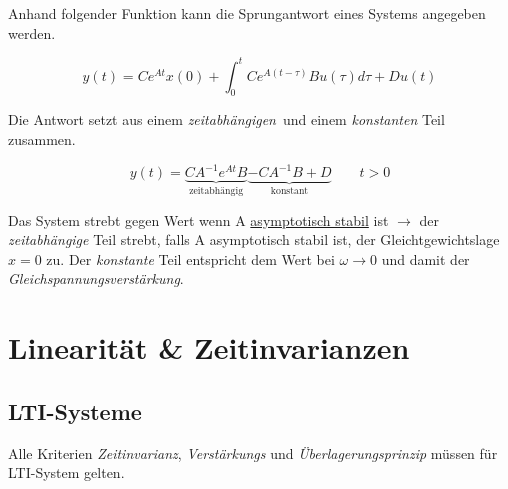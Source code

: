 \documentclass[
  10pt,
  a4paper,
]{article}
\numberwithin{equation}{section}
\begin{document}
\begin{multicols}{2}
Anhand folgender Funktion kann die Sprungantwort eines Systems angegeben
werden.

\[
y(t)=Ce^{At}x(0)+\int^t_0Ce^{A(t-\tau)}Bu(\tau)d\tau+Du(t)
\]

Die Antwort setzt aus einem \emph{zeitabhängigen}~und einem
\emph{konstanten} Teil zusammen.

\[
y(t)=\underbrace{CA^{-1}e^{At}B}_{\text{zeitabhängig}}\underbrace{-CA^{-1}B+D}_{\text{konstant}}\qquad t>0
\]

Das System strebt gegen Wert wenn A \ul{asymptotisch stabil} ist
\(\rightarrow\) der \emph{zeitabhängige} Teil strebt, falls A
asymptotisch stabil ist, der Gleichtgewichtslage \(x=0\) zu. Der
\emph{konstante} Teil entspricht dem Wert bei \(\omega\rightarrow 0\)
und damit der \emph{Gleichspannungsverstärkung}.

\hypertarget{linearituxe4t-zeitinvarianzen}{%
\section{Linearität \&
Zeitinvarianzen}\label{linearituxe4t-zeitinvarianzen}}

\hypertarget{lti-systeme}{%
\subsection{LTI-Systeme}\label{lti-systeme}}

\begin{tcolorbox}[enhanced jigsaw, coltitle=black, arc=.35mm, breakable, opacityback=0, opacitybacktitle=0.6, rightrule=.15mm, titlerule=0mm, bottomrule=.15mm, leftrule=.75mm, bottomtitle=1mm, colframe=quarto-callout-important-color-frame, toprule=.15mm, colbacktitle=quarto-callout-important-color!10!white, toptitle=1mm, title=\textcolor{quarto-callout-important-color}{\faExclamation}\hspace{0.5em}{Anforderung}, left=2mm, colback=white]

Alle Kriterien \emph{Zeitinvarianz}, \emph{Verstärkungs} und
\emph{Überlagerungsprinzip} müssen für LTI-System gelten.

\end{tcolorbox}

\begin{tcolorbox}[enhanced jigsaw, coltitle=black, arc=.35mm, breakable, opacityback=0, opacitybacktitle=0.6, rightrule=.15mm, titlerule=0mm, bottomrule=.15mm, leftrule=.75mm, bottomtitle=1mm, colframe=quarto-callout-tip-color-frame, toprule=.15mm, colbacktitle=quarto-callout-tip-color!10!white, toptitle=1mm, title=\textcolor{quarto-callout-tip-color}{\faLightbulb}\hspace{0.5em}{Tipp}, left=2mm, colback=white]


\end{tcolorbox}
\end{multicols}
\end{document}
